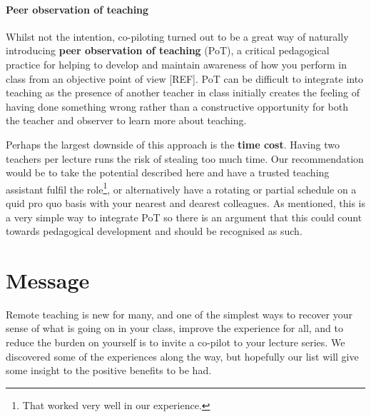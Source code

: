 \documentclass{article}
\begin{document}
\paragraph{Peer observation of teaching}

Whilst not the intention, co-piloting turned out to be a great way of naturally 
introducing \textbf{peer observation of teaching} (PoT), a critical pedagogical 
practice for helping to develop and maintain awareness of how you perform in 
class from an objective point of view [REF]. PoT can be difficult to integrate 
into teaching as the presence of another teacher in class initially creates the 
feeling of having done something wrong rather than a constructive opportunity 
for both the teacher and observer to learn more about teaching.

Perhaps the largest downside of this approach is the \textbf{time cost}. Having 
two teachers per lecture runs the risk of stealing too much time. Our 
recommendation would be to take the potential described here and have a trusted 
teaching assistant fulfil the role\footnote{%
  That worked very well in our experience.
}, or alternatively have a rotating or partial schedule on a quid pro quo basis 
with your nearest and dearest colleagues. As mentioned, this is a very simple 
way to integrate PoT so there is an argument that this could count towards 
pedagogical development and should be recognised as such.


\section*{Message}

Remote teaching is new for many, and one of the simplest ways to recover your sense of what is going on in your class, improve the experience for all, and to reduce the burden on yourself is to invite a co-pilot to your lecture series. We discovered some of the experiences along the way, but hopefully our list will give some insight to the positive benefits to be had.


\printbibliography
\end{document}
